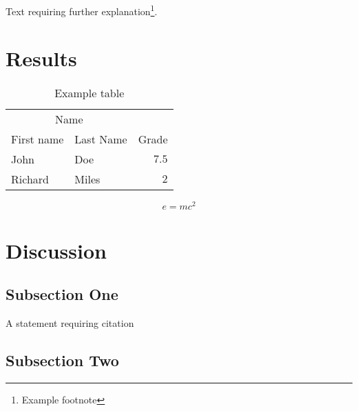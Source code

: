 \documentclass[twoside,twocolumn]{article}
\begin{document}
Text requiring further explanation\footnote{Example footnote}.


\section{Results}

\begin{table}
\caption{Example table}
\centering
\begin{tabular}{llr}
\toprule
\multicolumn{2}{c}{Name} \\
\cmidrule(r){1-2}
First name & Last Name & Grade \\
\midrule
John & Doe & $7.5$ \\
Richard & Miles & $2$ \\
\bottomrule
\end{tabular}
\end{table}

\blindtext %

\begin{equation}
\label{eq:emc}
e = mc^2
\end{equation}

\blindtext %


\section{Discussion}

\subsection{Subsection One}

A statement requiring citation %
\blindtext %

\subsection{Subsection Two}

\blindtext %





 

\end{document}
